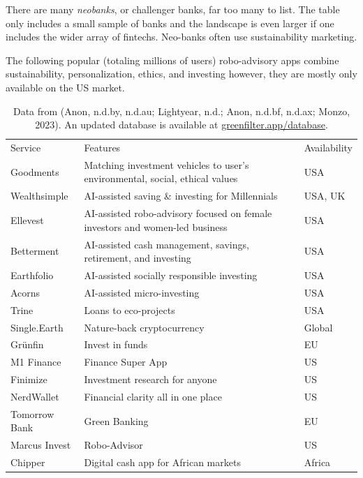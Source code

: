 \documentclass[
  letterpaper,
  DIV=11,
  numbers=noendperiod]{scrartcl}
\begin{document}
There are many \emph{neobanks}, or challenger banks, far too many to
list. The table only includes a small sample of banks and the landscape
is even larger if one includes the wider array of fintechs. Neo-banks
often use sustainability marketing.

The following popular (totaling millions of users) robo-advisory apps
combine sustainability, personalization, ethics, and investing however,
they are mostly only available on the US market.

\begin{longtable}[]{@{}
  >{\raggedright\arraybackslash}p{}
  >{\raggedright\arraybackslash}p{}
  >{\raggedright\arraybackslash}p{}@{}}
\caption{Data from (Anon, n.d.by, n.d.au; Lightyear, n.d.; Anon, n.d.bf,
n.d.ax; Monzo, 2023). An updated database is available at
\href{https://www.greenfilter.app/database}{greenfilter.app/database}.}\tabularnewline
\toprule\noalign{}
\endfirsthead
\endhead
\bottomrule\noalign{}
\endlastfoot
Service & Features & Availability \\
Goodments & Matching investment vehicles to user's environmental,
social, ethical values & USA \\
Wealthsimple & AI-assisted saving \& investing for Millennials & USA,
UK \\
Ellevest & AI-assisted robo-advisory focused on female investors and
women-led business & USA \\
Betterment & AI-assisted cash management, savings, retirement, and
investing & USA \\
Earthfolio & AI-assisted socially responsible investing & USA \\
Acorns & AI-assisted micro-investing & USA \\
Trine & Loans to eco-projects & USA \\
Single.Earth & Nature-back cryptocurrency & Global \\
Grünfin & Invest in funds & EU \\
M1 Finance & Finance Super App & US \\
Finimize & Investment research for anyone & US \\
NerdWallet & Financial clarity all in one place & US \\
Tomorrow Bank & Green Banking & EU \\
Marcus Invest & Robo-Advisor & US \\
Chipper & Digital cash app for African markets & Africa \\

\end{longtable}
\end{document}
